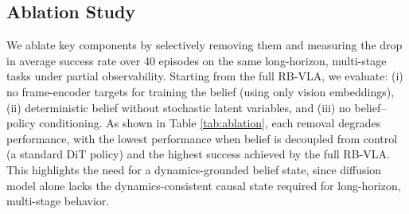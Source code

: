 \documentclass[conference]{IEEEtran}
\begin{document}
\subsection{Ablation Study}
We ablate key components by selectively removing them and measuring the drop in average success rate over 40 episodes on the same long-horizon, multi-stage tasks under partial observability. Starting from the full RB-VLA, we evaluate: (i) no frame-encoder targets for training the belief (using only vision embeddings), (ii) deterministic belief without stochastic latent variables, and (iii) no belief–policy conditioning. As shown in Table \ref{tab:ablation}, each removal degrades performance, with the lowest performance when belief is decoupled from control (a standard DiT policy) and the highest success achieved by the full RB-VLA. This highlights the need for a dynamics-grounded belief state, since diffusion model alone lacks the dynamics-consistent causal state required for long-horizon, multi-stage behavior.
\begin{table}[t]
\centering
\caption{Component Ablation on Two-Object Pick-and-Place task. Average success rate over 40 episodes under partial observability.}
\label{tab:ablation}
\setlength{\tabcolsep}{6pt}
\renewcommand{\arraystretch}{1.0}
\scriptsize
{}
\end{table}
\end{document}

